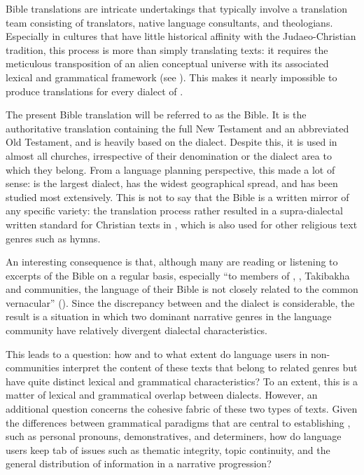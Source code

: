 \documentclass[output=paper
,modfonts
,nonflat]{langsci/langscibook}
\begin{document}
Bible translations are intricate undertakings that typically involve a translation team consisting of translators, native language consultants, and theologians. Especially in cultures that have little historical affinity with the Judaeo-Christian tradition, this process is more than simply translating texts: it requires the meticulous transposition of an alien conceptual universe with its associated lexical and grammatical framework (see \citealt{DeBusser2013}). This makes it nearly impossible to produce translations for every dialect of .

The present  Bible translation \citep{Bible2000} will be referred to as the  Bible. It is the authoritative translation containing the full New Testament and an abbreviated Old Testament, and is heavily based on the  dialect. Despite this, it is used in almost all  churches, irrespective of their denomination or the dialect area to which they belong. From a language planning perspective, this made a lot of sense:  is the largest dialect, has the widest geographical spread, and has been studied most extensively. This is not to say that the  Bible is a written mirror of any specific  variety: the translation process rather resulted in a supra-dialectal written standard for Christian texts in , which is also used for other religious text genres such as hymns.

An interesting consequence is that, although many  are reading or listening to excerpts of the Bible on a regular basis, especially “to members of , , Takibakha and  communities, the language of their Bible is not closely related to the common vernacular” (\citealt[67]{DeBusser2013}). Since the discrepancy between  and the  dialect is considerable, the result is a situation in which two dominant narrative genres in the  language community have relatively divergent dialectal characteristics. 

This leads to a question: how and to what extent do language users in non- communities interpret the content of these texts that belong to related genres but have quite distinct lexical and grammatical characteristics? To an extent, this is a matter of lexical and grammatical overlap between dialects. However, an additional question concerns the cohesive fabric of these two types of texts. Given the differences between grammatical paradigms that are central to establishing , such as personal pronouns, demonstratives, and determiners, how do language users keep tab of issues such as thematic integrity, topic continuity, and the general distribution of information in a narrative progression?
\end{document}
